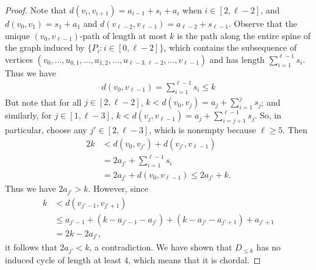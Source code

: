 \documentclass[12pt]{article}
\theoremstyle{definition}
\begin{document}
\begin{proof}
		Note that $d(v_i,v_{i+1}) = a_{i-1} + s_{i} + a_{i}$ when $i \in [2,\ell-2]$, and $d(v_0,v_1) = s_1 + a_1$ and $d(v_{\ell-2},v_{\ell-1}) = a_{\ell-2}+s_{\ell-1}$.  Observe that the unique $(v_0,v_{\ell-1})$-path of length at most $k$ is the path along the entire spine of the graph induced by $\{P_i: i \in [0,\ell-2]\}$, which contains the subsequence of vertices $(v_0, \ldots, u_{0,1}, \ldots, u_{1,2}, \ldots, u_{\ell-3,\ell-2}, \ldots, v_{\ell-1})$ and has length $\sum_{i=1}^{\ell-1} s_i$.  Thus we have
			\begin{align*}
				d(v_0,v_{\ell-1}) =  \sum_{i=1}^{\ell-1} s_i \leq k	
			\end{align*}
		But note that for all $j \in [2, \ell-2]$, $k < d(v_0,v_j) = a_j + \sum_{i = 1}^js_j$; and similarly, for $j \in [1, \ell-3]$, $k < d(v_j, v_{\ell-1}) = a_j + \sum_{i = j+1}^{\ell-1}s_j$.  So, in particular, choose any $j' \in [2,\ell-3]$, which is nonempty because $\ell \geq 5$.  Then
		\begin{align*}
			2k &< d(v_0,v_{j'}) + d(v_{j'},v_{\ell-1}) 	\\
			&= 2a_{j'} + \sum_{i = 1}^{\ell-1}s_i 	\\
			&= 2a_{j'} + d(v_0,v_{\ell-1}) \leq 2a_{j'} + k.
		\end{align*}
		Thus we have $2a_{j'} > k$.  However, since 
		\begin{align*}
			k &< d(v_{j'-1},v_{j'+1}) 	\\
			&\leq a_{j'-1} + (k-a_{j'-1}-a_{j'}) + (k - a_{j'}-a_{j'+1}) + a_{j'+1} 	\\
			&= 2k - 2a_{j'},
		\end{align*}
		it follows that $2a_{j'} < k$, a contradiction.  We have shown that $D_{\leq k}$ has no induced cycle of length at least $4$, which means that it is chordal. \qedhere
	\end{proof}
\end{document}
